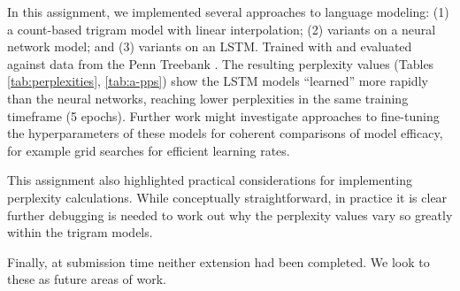 \documentclass[11pt]{article}
\begin{document}
In this assignment, we implemented several approaches to language modeling: (1) a count-based trigram model with linear interpolation; (2) variants on a neural network model; and (3) variants on an LSTM. Trained with and evaluated against data from the Penn Treebank \citep{marcus-etal-1993-building}. The resulting perplexity values (Tables \ref{tab:perplexities}, \ref{tab:a-pps}) show the LSTM models ``learned'' more rapidly than the neural networks, reaching lower perplexities in the same training timeframe (5 epochs). Further work might investigate approaches to fine-tuning the hyperparameters of these models for coherent comparisons of model efficacy, for example grid searches for efficient learning rates.

This assignment also highlighted practical considerations for implementing perplexity calculations. While conceptually straightforward, in practice it is clear further debugging is needed to work out why the perplexity values vary so greatly within the trigram models.

Finally, at submission time neither extension had been completed. We look to these as future areas of work.



\end{document}
